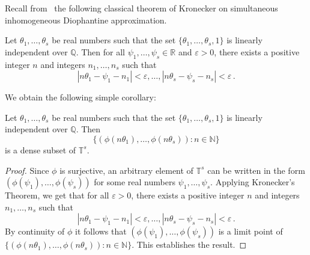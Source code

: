 Recall from~\cite{HardyAndWright} the following classical theorem of
Kronecker on simultaneous inhomogeneous Diophantine approximation.
\begin{theorem}[Kronecker]
  Let $\theta_1,\ldots,\theta_s$ be real numbers such that the set
  $\{\theta_1,\ldots,\theta_s,1\}$ is linearly independent over
  $\mathbb{Q}$.  Then for all $\psi_1,\ldots,\psi_s \in \mathbb{R}$
  and $\varepsilon > 0$, there exists a positive integer $n$
and integers $n_1,\ldots,n_s$ such that
\[ |n\theta_1 - \psi_1 - n_1| < \varepsilon, \ldots ,
   |n\theta_s - \psi_s - n_s| < \varepsilon \, .\]
\end{theorem}

We obtain the following simple corollary:
\begin{corollary}
  Let $\theta_1,\ldots,\theta_s$ be real numbers such that the set
  $\{ \theta_1,\ldots,\theta_s,1\}$ is linearly independent over
  $\mathbb{Q}$.  Then
\[ \{ (\phi(n\theta_1),\ldots,\phi(n\theta_s)) : n \in \mathbb{N} \} \]
is a dense subset of $\mathbb{T}^s$.
\label{corl:kronecker}
\end{corollary}
\begin{proof}
  Since $\phi$ is surjective, an arbitrary element of $\mathbb{T}^s$
  can be written in the form $(\phi(\psi_1),\ldots,\phi(\psi_s))$ for
  some real numbers $\psi_1,\ldots,\psi_s$.
Applying Kronecker's Theorem, we get that
for all $\varepsilon > 0$, there exists a positive integer $n$
and integers $n_1,\ldots,n_s$ such that
\[ |n\theta_1 - \psi_1 - n_1| < \varepsilon, \ldots , |n\theta_s
  - \psi_s - n_s| < \varepsilon \, .\] By continuity of $\phi$ it
follows that $(\phi(\psi_1),\ldots,\phi(\psi_s))$ is a limit point of
$ \{ (\phi(n\theta_1),\ldots,\phi(n\theta_s)) : n \in \mathbb{N} \}$.
This establishes the result.
\end{proof}
